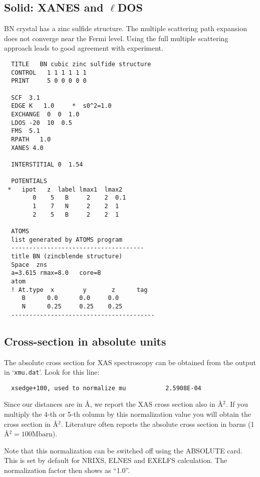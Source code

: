 \documentclass[11pt,oneside]{report} %
\newcommand{\file}[1]{`\texttt{#1}'}
\begin{document}
\subsection{Solid: XANES and $\ell$DOS}
\label{sec:Solid-1}
BN crystal has a zinc sulfide structure.  The
multiple scattering path expansion does not converge near the Fermi level.
Using the full multiple scattering approach leads to good agreement
with experiment.

\begin{verbatim}
  TITLE   BN cubic zinc sulfide structure
  CONTROL   1 1 1 1 1 1
  PRINT     5 0 0 0 0 0 
 
  SCF  3.1
  EDGE K   1.0     *  s0^2=1.0
  EXCHANGE  0  0  1.0
  LDOS -20  10  0.5
  FMS  5.1
  RPATH   1.0
  XANES 4.0
 
  INTERSTITIAL 0  1.54
 
  POTENTIALS
 *   ipot   z  label lmax1  lmax2
        0    5   B     2    2  0.1
        1    7   N     2    2  1
        2    5   B     2    2  1
 
  ATOMS
  list generated by ATOMS program
  -------------------------------------
  title BN (zincblende structure)
  Space  zns
  a=3.615 rmax=8.0   core=B
  atom
  ! At.type  x        y       z      tag
     B      0.0      0.0     0.0
     N      0.25     0.25    0.25
  ----------------------------------------
\end{verbatim}


\subsection{Cross-section in absolute units}
\label{sec:Absol-cross-sect}
The absolute cross section for XAS spectroscopy can be obtained from the output in
\file{xmu.dat}. Look for this line:

\begin{verbatim}
  xsedge+100, used to normalize mu           2.5908E-04
\end{verbatim}

Since our distances are in \AA, we report the XAS cross section also in \AA$^2$.
If you multiply the 4-th or 5-th column by this normalization value
you will obtain the cross section in \AA$^2$. Literature often reports the absolute
cross section in barns (1 \AA$^2 = 100 \mathrm{Mbarn}$).

Note that this normalization can be switched off using the ABSOLUTE card.  This is set
by default for NRIXS, ELNES and EXELFS calculation.  The normalization factor then shows as "`1.0"'. 
\end{document}

